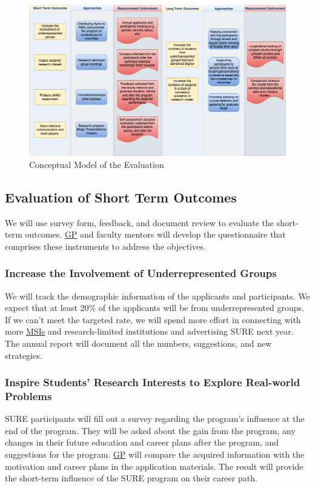 \documentclass[11pt]{NSFamsart}
\newcommand{\GP}{\hyperlink{GPlink}{GP}\xspace}
\newcommand{\MSIs}{\hyperlink{MSIlink}{MSIs}\xspace}
\begin{document}
\begin{figure}[tbh]
    \centering
    \includegraphics[width = 16cm]{EvalModel.png}
    \caption{Conceptual Model of the Evaluation}
    \label{fig:my_label}
\end{figure}

\subsection{Evaluation of Short Term Outcomes}

We will use survey form, feedback, and document review to evaluate the short-term outcomes. 
\GP and faculty mentors will develop the questionnaire that comprises these instruments to address the objectives. 

\subsubsection{Increase the Involvement of Underrepresented Groups}
We will track the demographic information of the applicants and participants. We expect that at least 20\% of the applicants will be from underrepresented groups. If we can't meet the targeted rate, we will spend more effort in connecting with more \MSIs and research-limited institutions and advertising SURE next year.  The annual report will document all the numbers, suggestions, and new strategies. 

\subsubsection{
Inspire Students' Research Interests to Explore Real-world Problems}

SURE participants will fill out a survey regarding the program's influence at the end of the program. They will be asked about the gain from the program, any changes in their future education and career plans after the program, and suggestions for the program. \GP will compare the acquired information with the motivation and career plans in the application materials. The result will provide the short-term influence of the SURE program on their career path.
\end{document}
